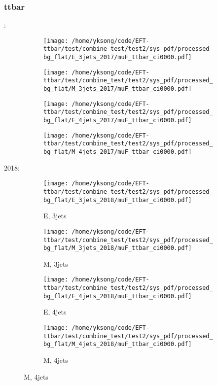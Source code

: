 \documentclass{beamer}
\begin{document}
\begin{frame}
\frametitle{ttbar}
\fontsize{5}{1}:
\begin{figure}
\centering
\begin{subfigure}[b]{0.24\textwidth}
\texttt{[image: /home/yksong/code/EFT-ttbar/test/combine\_test/test2/sys\_pdf/processed\_bg\_flat/E\_3jets\_2017/muF\_ttbar\_ci0000.pdf]}
\end{subfigure}
\begin{subfigure}[b]{0.24\textwidth}
\texttt{[image: /home/yksong/code/EFT-ttbar/test/combine\_test/test2/sys\_pdf/processed\_bg\_flat/M\_3jets\_2017/muF\_ttbar\_ci0000.pdf]}
\end{subfigure}
\begin{subfigure}[b]{0.24\textwidth}
\texttt{[image: /home/yksong/code/EFT-ttbar/test/combine\_test/test2/sys\_pdf/processed\_bg\_flat/E\_4jets\_2017/muF\_ttbar\_ci0000.pdf]}
\end{subfigure}
\begin{subfigure}[b]{0.24\textwidth}
\texttt{[image: /home/yksong/code/EFT-ttbar/test/combine\_test/test2/sys\_pdf/processed\_bg\_flat/M\_4jets\_2017/muF\_ttbar\_ci0000.pdf]}
\end{subfigure}
\end{figure}
2018:
\begin{figure}
\centering
\begin{subfigure}[b]{0.24\textwidth}
\texttt{[image: /home/yksong/code/EFT-ttbar/test/combine\_test/test2/sys\_pdf/processed\_bg\_flat/E\_3jets\_2018/muF\_ttbar\_ci0000.pdf]}
\captionsetup{font=tiny}
\caption{E, 3jets}
\end{subfigure}
\begin{subfigure}[b]{0.24\textwidth}
\texttt{[image: /home/yksong/code/EFT-ttbar/test/combine\_test/test2/sys\_pdf/processed\_bg\_flat/M\_3jets\_2018/muF\_ttbar\_ci0000.pdf]}
\captionsetup{font=tiny}
\caption{M, 3jets}
\end{subfigure}
\begin{subfigure}[b]{0.24\textwidth}
\texttt{[image: /home/yksong/code/EFT-ttbar/test/combine\_test/test2/sys\_pdf/processed\_bg\_flat/E\_4jets\_2018/muF\_ttbar\_ci0000.pdf]}
\captionsetup{font=tiny}
\caption{E, 4jets}
\end{subfigure}
\begin{subfigure}[b]{0.24\textwidth}
\texttt{[image: /home/yksong/code/EFT-ttbar/test/combine\_test/test2/sys\_pdf/processed\_bg\_flat/M\_4jets\_2018/muF\_ttbar\_ci0000.pdf]}
\captionsetup{font=tiny}
\caption{M, 4jets}
\end{subfigure}
\end{figure}
\end{frame}
\end{document}
